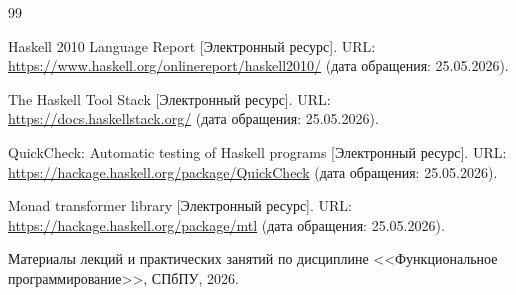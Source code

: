 \begin{thebibliography}{99}

Haskell 2010 Language Report [Электронный ресурс]. URL: \url{https://www.haskell.org/onlinereport/haskell2010/} (дата обращения: 25.05.2026).

The Haskell Tool Stack [Электронный ресурс]. URL: \url{https://docs.haskellstack.org/} (дата обращения: 25.05.2026).

QuickCheck: Automatic testing of Haskell programs [Электронный ресурс]. URL: \url{https://hackage.haskell.org/package/QuickCheck} (дата обращения: 25.05.2026).

Monad transformer library [Электронный ресурс]. URL: \url{https://hackage.haskell.org/package/mtl} (дата обращения: 25.05.2026).

Материалы лекций и практических занятий по дисциплине <<Функциональное программирование>>, СПбПУ, 2026.

\end{thebibliography}
